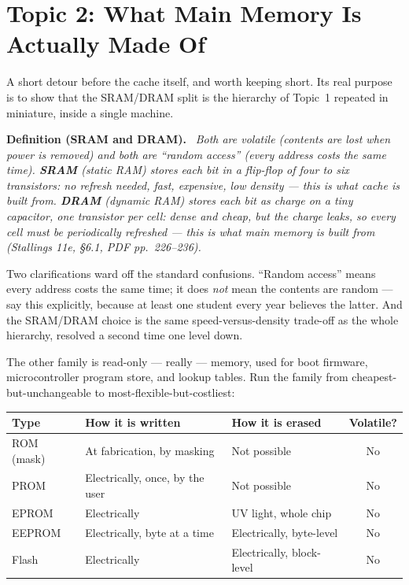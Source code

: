 \documentclass[11pt]{article}
\newenvironment{definitionbox}[1]{\par\noindent\textbf{Definition (#1).}\ \itshape}{\par\vspace{0.3em}}
\begin{document}
\section{Topic 2: What Main Memory Is Actually Made Of}

A short detour before the cache itself, and worth keeping short. Its real purpose is to show that the SRAM/DRAM split is the hierarchy of Topic~1 repeated in miniature, inside a single machine.

\begin{definitionbox}{SRAM and DRAM}
Both are \emph{volatile} (contents are lost when power is removed) and both are ``random access'' (every address costs the same time). \textbf{SRAM} (static RAM) stores each bit in a flip-flop of four to six transistors: no refresh needed, fast, expensive, low density --- this is what \emph{cache} is built from. \textbf{DRAM} (dynamic RAM) stores each bit as charge on a tiny capacitor, one transistor per cell: dense and cheap, but the charge leaks, so every cell must be periodically \emph{refreshed} --- this is what \emph{main memory} is built from (Stallings 11e, \S6.1, PDF pp.~226--236).
\end{definitionbox}

Two clarifications ward off the standard confusions. ``Random access'' means every address costs the same time; it does \emph{not} mean the contents are random --- say this explicitly, because at least one student every year believes the latter. And the SRAM/DRAM choice is the same speed-versus-density trade-off as the whole hierarchy, resolved a second time one level down.

The other family is read-only --- really  --- memory, used for boot firmware, microcontroller program store, and lookup tables. Run the family from cheapest-but-unchangeable to most-flexible-but-costliest:

\begin{center}
\footnotesize
\begin{tabular}{@{}lllc@{}}
  \toprule
  \textbf{Type} & \textbf{How it is written} & \textbf{How it is erased} & \textbf{Volatile?} \\
  \midrule
  ROM (mask)  & At fabrication, by masking      & Not possible               & No \\
  PROM        & Electrically, once, by the user & Not possible               & No \\
  EPROM       & Electrically                    & UV light, whole chip       & No \\
  EEPROM      & Electrically, byte at a time    & Electrically, byte-level   & No \\
  Flash       & Electrically                    & Electrically, block-level  & No \\
  \bottomrule
\end{tabular}
\end{center}
\end{document}
